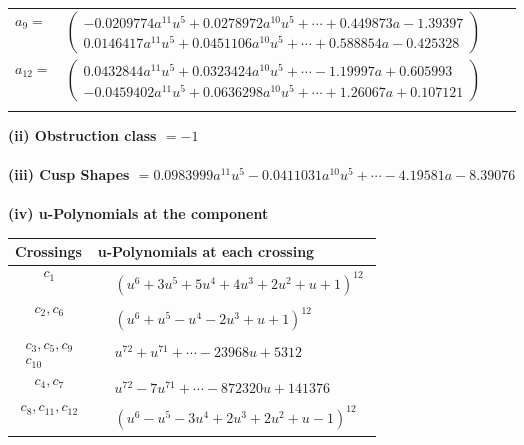 \documentclass[1p]{elsarticle_modified}
\theoremstyle{definition}
\begin{document}
\begin{tabular}{m{7pt} m{180pt} m{7pt} m{180pt} }
\flushright $a_{9}=$&$\begin{pmatrix}-0.0209774 a^{11} u^{5}+0.0278972 a^{10} u^{5}+\cdots+0.449873 a-1.39397\\0.0146417 a^{11} u^{5}+0.0451106 a^{10} u^{5}+\cdots+0.588854 a-0.425328\end{pmatrix}$ \\
\flushright $a_{12}=$&$\begin{pmatrix}0.0432844 a^{11} u^{5}+0.0323424 a^{10} u^{5}+\cdots-1.19997 a+0.605993\\-0.0459402 a^{11} u^{5}+0.0636298 a^{10} u^{5}+\cdots+1.26067 a+0.107121\end{pmatrix}$\\&\end{tabular}
\flushleft \textbf{(ii) Obstruction class $= -1$}\\~\\
\flushleft \textbf{(iii) Cusp Shapes $= 0.0983999 a^{11} u^{5}-0.0411031 a^{10} u^{5}+\cdots-4.19581 a-8.39076$}\\~\\
\newpage\renewcommand{\arraystretch}{1}
\flushleft \textbf{(iv) u-Polynomials at the component}\newline \\
\begin{tabular}{m{50pt}|m{274pt}}
Crossings & \hspace{64pt}u-Polynomials at each crossing \\
\hline $$\begin{aligned}c_{1}\end{aligned}$$&$\begin{aligned}
&(u^6+3 u^5+5 u^4+4 u^3+2 u^2+u+1)^{12}
\end{aligned}$\\
\hline $$\begin{aligned}c_{2},c_{6}\end{aligned}$$&$\begin{aligned}
&(u^6+u^5- u^4-2 u^3+u+1)^{12}
\end{aligned}$\\
\hline $$\begin{aligned}c_{3},c_{5},c_{9}\\c_{10}\end{aligned}$$&$\begin{aligned}
&u^{72}+u^{71}+\cdots-23968 u+5312
\end{aligned}$\\
\hline $$\begin{aligned}c_{4},c_{7}\end{aligned}$$&$\begin{aligned}
&u^{72}-7 u^{71}+\cdots-872320 u+141376
\end{aligned}$\\
\hline $$\begin{aligned}c_{8},c_{11},c_{12}\end{aligned}$$&$\begin{aligned}
&(u^6- u^5-3 u^4+2 u^3+2 u^2+u-1)^{12}
\end{aligned}$\\
\hline
\end{tabular}\\~\\
\end{document}
